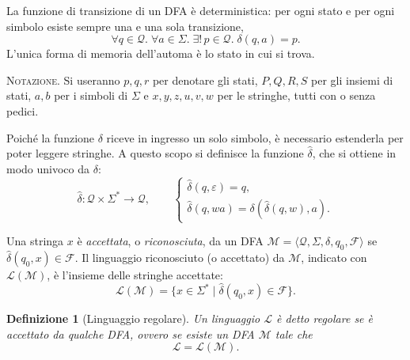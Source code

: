 \documentclass[a4paper, 11pt, oneside]{book}
\theoremstyle{formale}
\newtheorem*{definition}{Definizione}
\begin{document}
    La funzione di transizione di un DFA \`e deterministica: per ogni stato e per ogni
    simbolo esiste sempre una e una sola transizione,
    \begin{equation*}
        \forall q \in \mathcal{Q}.\; \forall a \in \Sigma.\;
        \exists!\, p \in \mathcal{Q}.\; \delta(q, a) = p.
    \end{equation*}
    L'unica forma di memoria dell'automa \`e lo stato in cui si trova.

    \textsc{Notazione}. Si useranno $p, q, r$ per denotare gli stati, $P, Q, R, S$ per gli
    insiemi di stati, $a, b$ per i simboli di $\Sigma$ e $x, y, z, u, v, w$ per le
    stringhe, tutti con o senza pedici.

    Poich\'e la funzione $\delta$ riceve in ingresso un solo simbolo, \`e necessario
    estenderla per poter leggere stringhe. A questo scopo si definisce la funzione
    $\hat{\delta}$, che si ottiene in modo univoco da $\delta$:
    \begin{equation*}
        \hat{\delta} \colon \mathcal{Q} \times \Sigma^* \to \mathcal{Q},
        \qquad
        \begin{cases}
            \hat{\delta}(q, \varepsilon) = q, \\
            \hat{\delta}(q, wa) = \delta(\hat{\delta}(q, w), a).
        \end{cases}
    \end{equation*}

    Una stringa $x$ \`e \emph{accettata}, o \emph{riconosciuta}, da un DFA
    $\mathcal{M} = \langle \mathcal{Q}, \Sigma, \delta, q_0, \mathcal{F} \rangle$ se
    $\hat{\delta}(q_0, x) \in \mathcal{F}$. Il linguaggio riconosciuto (o accettato) da
    $\mathcal{M}$, indicato con $\mathcal{L}(\mathcal{M})$, \`e l'insieme delle stringhe
    accettate:
    \begin{equation*}
        \mathcal{L}(\mathcal{M})
        = \{x \in \Sigma^* \mid \hat{\delta}(q_0, x) \in \mathcal{F}\}.
    \end{equation*}

    \begin{definition}[Linguaggio regolare]
        Un linguaggio $\mathcal{L}$ \`e detto \emph{regolare} se \`e accettato da qualche
        DFA, ovvero se esiste un DFA $\mathcal{M}$ tale che
        \begin{equation*}
            \mathcal{L} = \mathcal{L}(\mathcal{M}).
        \end{equation*}
    \end{definition}
\end{document}
